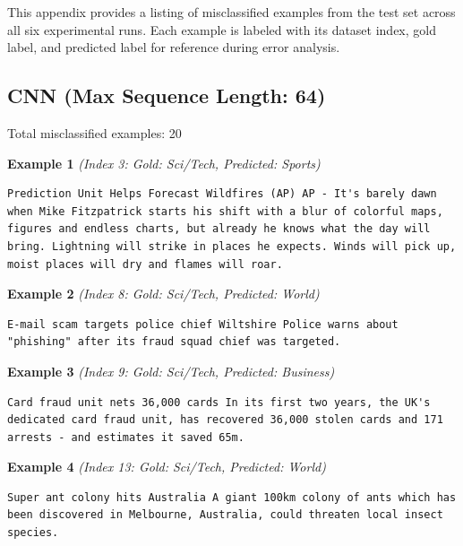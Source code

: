 This appendix provides a listing of misclassified examples from the test set across all six experimental runs.
Each example is labeled with its dataset index, gold label, and predicted label for reference during error analysis.

\subsection{CNN (Max Sequence Length: 64)}
\label{app:run1}

Total misclassified examples: 20

\noindent
\textbf{Example 1} \quad \textit{(Index 3: Gold: Sci/Tech, Predicted: Sports)}

\begin{Verbatim}[breaklines=true,breakanywhere=true,fontsize=\small]
Prediction Unit Helps Forecast Wildfires (AP) AP - It's barely dawn when Mike Fitzpatrick starts his shift with a blur of colorful maps, figures and endless charts, but already he knows what the day will bring. Lightning will strike in places he expects. Winds will pick up, moist places will dry and flames will roar.
\end{Verbatim}

\noindent
\textbf{Example 2} \quad \textit{(Index 8: Gold: Sci/Tech, Predicted: World)}

\begin{Verbatim}[breaklines=true,breakanywhere=true,fontsize=\small]
E-mail scam targets police chief Wiltshire Police warns about "phishing" after its fraud squad chief was targeted.
\end{Verbatim}

\noindent
\textbf{Example 3} \quad \textit{(Index 9: Gold: Sci/Tech, Predicted: Business)}

\begin{Verbatim}[breaklines=true,breakanywhere=true,fontsize=\small]
Card fraud unit nets 36,000 cards In its first two years, the UK's dedicated card fraud unit, has recovered 36,000 stolen cards and 171 arrests - and estimates it saved 65m.
\end{Verbatim}

\noindent
\textbf{Example 4} \quad \textit{(Index 13: Gold: Sci/Tech, Predicted: World)}

\begin{Verbatim}[breaklines=true,breakanywhere=true,fontsize=\small]
Super ant colony hits Australia A giant 100km colony of ants which has been discovered in Melbourne, Australia, could threaten local insect species.
\end{Verbatim}

